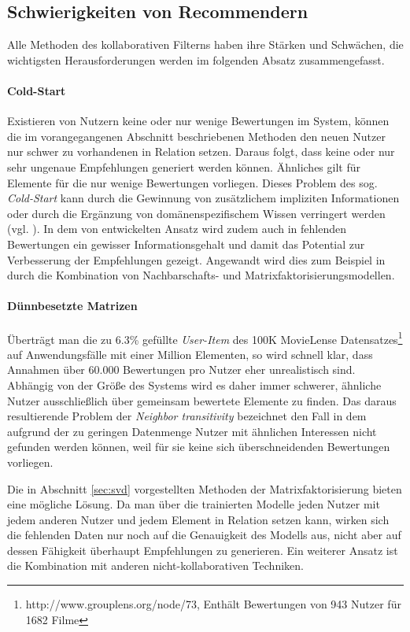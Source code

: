 \subsection{Schwierigkeiten von Recommendern}\label{sec:filterissues}

Alle Methoden des kollaborativen Filterns haben ihre Stärken und Schwächen, die wichtigsten Herausforderungen werden im folgenden Absatz zusammengefasst.

\paragraph{Cold-Start} Existieren von Nutzern keine oder nur wenige Bewertungen im System, können die im vorangegangenen Abschnitt beschriebenen Methoden den neuen Nutzer nur schwer zu vorhandenen in Relation setzen. Daraus folgt, dass keine oder nur sehr ungenaue Empfehlungen generiert werden können. Ähnliches gilt für Elemente für die nur wenige Bewertungen vorliegen. Dieses Problem des sog. \textit{Cold-Start} kann durch die Gewinnung von zusätzlichem impliziten Informationen oder durch die Ergänzung von domänenspezifischem Wissen verringert werden (vgl. \citep{claypool99}).  In dem von \citep{Steck:2010:TTR:1835804.1835895} entwickelten Ansatz wird zudem auch in fehlenden Bewertungen ein gewisser Informationsgehalt und damit das Potential zur Verbesserung der Empfehlungen gezeigt. Angewandt wird dies zum Beispiel in \citep{Toscher:2008:INA:1722149.1722153} durch die Kombination von Nachbarschafts- und Matrixfaktorisierungsmodellen.

\paragraph{Dünnbesetzte Matrizen} Überträgt man die zu 6.3\% gefüllte \textit{User-Item} des 100K MovieLense Datensatzes\footnote{http://www.grouplens.org/node/73, Enthält Bewertungen von 943 Nutzer für 1682 Filme} auf Anwendungsfälle mit einer Million Elementen, so wird schnell klar, dass Annahmen über 60.000 Bewertungen pro Nutzer eher unrealistisch sind. Abhängig von der Größe des Systems wird es daher immer schwerer, ähnliche Nutzer ausschließlich über gemeinsam bewertete Elemente zu finden. Das daraus resultierende Problem der \textit{Neighbor transitivity} bezeichnet den Fall in dem aufgrund der zu geringen Datenmenge Nutzer mit ähnlichen Interessen nicht gefunden werden können, weil für sie keine sich überschneidenden Bewertungen vorliegen.

Die in Abschnitt \ref{sec:svd} vorgestellten Methoden der Matrixfaktorisierung bieten eine mögliche Lösung. Da man über die trainierten Modelle jeden Nutzer mit jedem anderen Nutzer und jedem Element in Relation setzen kann, wirken sich die fehlenden Daten nur noch auf die Genauigkeit des Modells aus, nicht aber auf dessen Fähigkeit überhaupt Empfehlungen zu generieren. Ein weiterer Ansatz ist die Kombination mit anderen nicht-kollaborativen Techniken. \citep{Koren:2009:MFT:1608565.1608614,claypool99}

